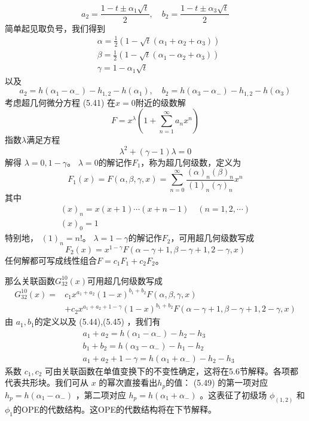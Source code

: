 $$
a_{2}=\frac{1-t \pm \alpha_{1} \sqrt{t}}{2}, \quad b_{2}=\frac{1-t \pm \alpha_{3} \sqrt{t}}{2}
$$
简单起见取负号，我们得到
\begin{equation}
	\begin{aligned} &\alpha=\frac{1}{2}\left(1-\sqrt{t}\left(\alpha_{1}+\alpha_{2}+\alpha_{3}\right)\right) \\& \beta=\frac{1}{2}\left(1-\sqrt{t}\left(\alpha_{1}-\alpha_{2}+\alpha_{3}\right)\right) \\& \gamma=1-\alpha_{1} \sqrt{t} \end{aligned}
\end{equation}
以及
\begin{equation}
	a_{2}=h\left(\alpha_{1}-\alpha_{-}\right)-h_{1,2}-h\left(\alpha_{1}\right), \quad b_{2}=h\left(\alpha_{3}-\alpha_{-}\right)-h_{1,2}-h\left(\alpha_{3}\right)
\end{equation}
考虑超几何微分方程 (5.41) 在$ x=0 $附近的级数解
$$
F=x^{\lambda}\left(1+\sum_{n=1}^{\infty} a_{n} x^{n}\right)
$$
指数$ \lambda $满足方程
$$
\lambda^{2}+(\gamma-1) \lambda=0
$$
解得 $\lambda=0,1-\gamma $。 $\lambda=0 $的解记作$ F_1 $，称为超几何级数，定义为
\begin{equation}
	F_{1}(x)=F(\alpha, \beta, \gamma, x)=\sum_{n=0}^{\infty} \frac{(\alpha)_{n}(\beta)_{n}}{(1)_{n}(\gamma)_{n}} x^{n}
\end{equation}
其中
\begin{equation}
	\begin{array}{l} (x)_{n}=x(x+1) \cdots(x+n-1) \quad(n=1,2, \cdots)\\ (x)_{0}=1 \end{array}
\end{equation}
特别地， $(1)_{n}=n ! $。 $\lambda=1-\gamma $的解记作$ F_2 $，可用超几何级数写成
\begin{equation}
	F_{2}(x)=x^{1-\gamma} F(\alpha-\gamma+1, \beta-\gamma+1,2-\gamma, x)
\end{equation}
任何解都可写成线性组合$ F=c_{1} F_{1}+c_{2} F_{2} $。

那么关联函数$ G_{32}^{10}(x) $可用超几何级数写成
\begin{equation}
	\begin{aligned} G_{32}^{10}(x)=& c_{1} x^{a_{1}+a_{2}}(1-x)^{b_{1}+b_{2}} F(\alpha, \beta, \gamma, x) \\ &+c_{2} x^{a_{1}+a_{2}+1-\gamma}(1-x)^{b_{1}+b_{2}} F(\alpha-\gamma+1, \beta-\gamma+1,2-\gamma, x) \end{aligned}
\end{equation}
由 $a_1,b_1 $的定义以及 (5.44),(5.45) ，我们有
\begin{align} &a_{1}+a_{2}=h\left(\alpha_{1}-\alpha_{-}\right)-h_{2}-h_{3} \\& b_{1}+b_{2}=h\left(\alpha_{3}-\alpha_{-}\right)-h_{1}-h_{2}\\& a_{1}+a_{2}+1-\gamma=h\left(\alpha_{1}+\alpha_{-}\right)-h_{2}-h_{3} \end{align}
系数 $c_1,c_2$ 可由关联函数在单值变换下的不变性确定，这将在5.6节解释。各项都代表共形块。我们可从 $x$ 的幂次直接看出$ h_p $的值： (5.49) 的第一项对应 $h_{p}=h\left(\alpha_{1}-\alpha_{-}\right)$ ，第二项对应 $h_{p}=h\left(\alpha_{1}+\alpha_{-}\right)$ 。这表征了初级场 $\phi_{(1,2)}$ 和 $\phi_1 $的OPE的代数结构。这OPE的代数结构将在下节解释。

